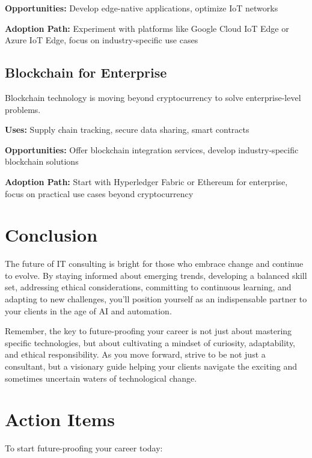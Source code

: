 \textbf{Opportunities:} Develop edge-native applications, optimize IoT networks

\textbf{Adoption Path:} Experiment with platforms like Google Cloud IoT Edge or Azure IoT Edge, focus on industry-specific use cases

\subsection{Blockchain for Enterprise}

Blockchain technology is moving beyond cryptocurrency to solve enterprise-level problems.

\textbf{Uses:} Supply chain tracking, secure data sharing, smart contracts

\textbf{Opportunities:} Offer blockchain integration services, develop industry-specific blockchain solutions

\textbf{Adoption Path:} Start with Hyperledger Fabric or Ethereum for enterprise, focus on practical use cases beyond cryptocurrency

\section{Conclusion}

The future of IT consulting is bright for those who embrace change and continue to evolve. By staying informed about emerging trends, developing a balanced skill set, addressing ethical considerations, committing to continuous learning, and adapting to new challenges, you'll position yourself as an indispensable partner to your clients in the age of AI and automation.

Remember, the key to future-proofing your career is not just about mastering specific technologies, but about cultivating a mindset of curiosity, adaptability, and ethical responsibility. As you move forward, strive to be not just a consultant, but a visionary guide helping your clients navigate the exciting and sometimes uncertain waters of technological change.

\section{Action Items}

To start future-proofing your career today:

